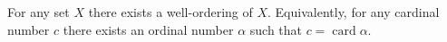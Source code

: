 For any set $X$ there exists a well-ordering of $X$. Equivalently, for any cardinal number $c$ there exists an ordinal number $\alpha$ such that $c = \operatorname{card} \alpha$.

